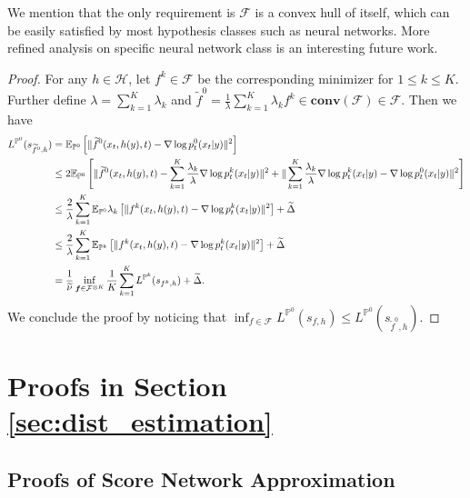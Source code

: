 \documentclass[11pt]{article}
\numberwithin{equation}{section}
\renewcommand{\P}{\mathbb{P}}
\begin{document}
We mention that the only requirement is $\mathcal{F}$ is a convex hull of itself, which can be easily satisfied by most hypothesis classes such as neural networks. 
More refined analysis on specific neural network class is an interesting future work.
\begin{proof}
    For any $h\in\mathcal{H}$, let $f^k\in\mathcal{F}$ be the corresponding minimizer for $1\leq k\leq K$.
    Further define $\lambda=\sum_{k=1}^K\lambda_k$ and $\widetilde{f}^0=\frac{1}{\lambda}\sum_{k=1}^K\lambda_kf^k\in\textbf{conv}(\mathcal{F})\in\mathcal{F}$.
    Then we have
    \begin{equation}
        \begin{aligned}
            L^{\P^0}(s_{\widetilde{f}^0,h})
            &=\E_{\P^0}\left[\|\widetilde{f}^0(x_t,h(y),t)-\nabla\log p_t^0(x_t|y)\|^2\right] \\
            &\leq 2\E_{\P^0}\left[\|\widetilde{f}^0(x_t,h(y),t)-\sum_{k=1}^K\frac{\lambda_k}{\lambda}\nabla\log p_t^k(x_t|y)\|^2 +\|\sum_{k=1}^K\frac{\lambda_k}{\lambda}\nabla\log p_t^k(x_t|y)-\nabla\log p_t^0(x_t|y)\|^2\right] \\
            &\leq \frac{2}{\lambda}\sum_{k=1}^K\E_{\P^0}\lambda_k\left[\|f^k(x_t,h(y),t)-\nabla\log p_t^k(x_t|y)\|^2\right]+ \widetilde{\Delta} \\
            &\leq \frac{2}{\lambda}\sum_{k=1}^K\E_{\P^k}\left[\|f^k(x_t,h(y),t)-\nabla\log p_t^k(x_t|y)\|^2\right]+ \widetilde{\Delta} \\
            &= \frac{1}{\widetilde{\nu}}\inf_{\vf\in\mathcal{F}^{\otimes K}}\frac{1}{K}\sum_{k=1}^KL^{\P^k}(s_{f^k,h})+ \widetilde{\Delta}.
        \end{aligned}
    \end{equation}
    We conclude the proof by noticing that $\inf_{f\in\mathcal{F}}L^{\P^0}(s_{f,h})\leq L^{\P^0}(s_{\widetilde{f}^0,h})$.
\end{proof}

\section{Proofs in Section \ref{sec:dist_estimation}}

\subsection{Proofs of Score Network Approximation}\label{app:subsec:approximation}
\end{document}
